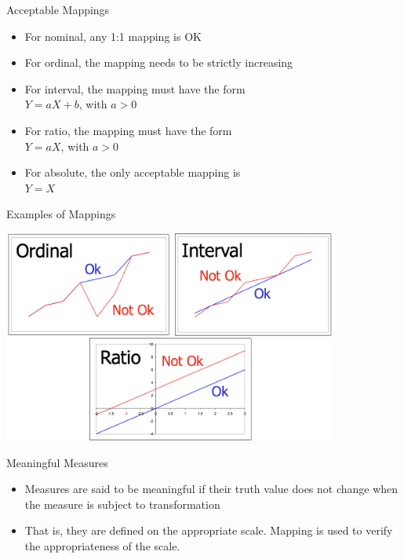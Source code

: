 \documentclass{beamer}
\begin{document}
\begin{frame}{\centerline{Acceptable Mappings}}

\begin{itemize}
\item For nominal, any 1:1 mapping is OK
\item For ordinal, the mapping needs to be strictly increasing
\item For interval, the mapping must have the form\\ 
\(Y = aX + b\), with \(a > 0\)
\item For ratio, the mapping must have the form\\
\(Y = aX\), with \(a > 0\)
\item For absolute, the only acceptable mapping is\\
\(Y = X\)

\end{itemize}

\end{frame}

\begin{frame}{\centerline{Examples of Mappings}}

\begin{center}
\includegraphics[width=110mm]{A2022.ScaleDeiDati/img-img16.png}
\end{center}

\end{frame}

\begin{frame}{\centerline{Meaningful Measures}}

\begin{itemize}
\item Measures are said to be meaningful if their truth value does not change when the measure is subject to transformation
\item That is, they are defined on the appropriate scale. Mapping is used to verify the appropriateness of the scale.
\end{itemize}

\end{frame}
\end{document}
